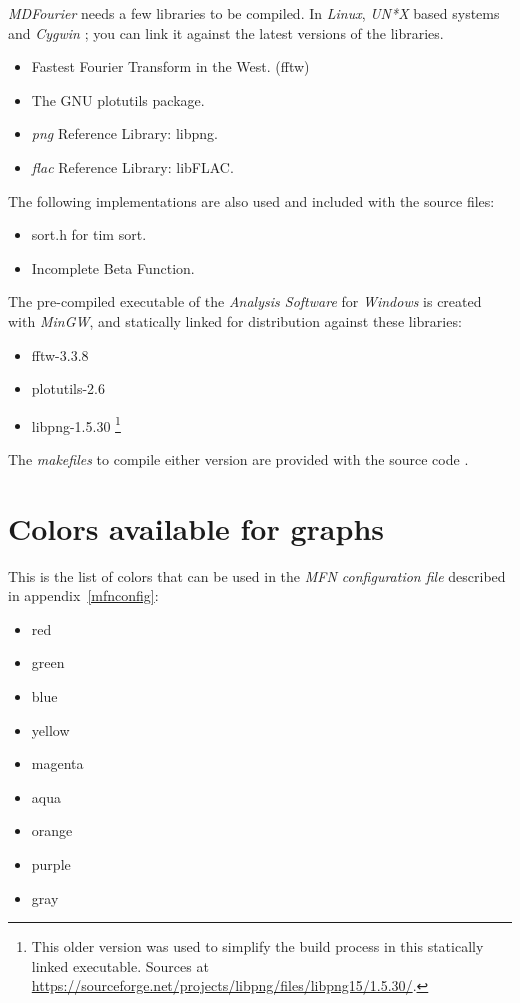\documentclass[10pt,a4paper]{report}
\newcommand{\ac}[1]{\textit{\mbox{\acrshort{#1}}}}
\begin{document}
\begin{appendices}
\textit{MDFourier} needs a few libraries to be compiled. In \textit{Linux}, \textit{UN*X} based systems and \textit{Cygwin} \cite{cygwin}; you can link it against the latest versions of the libraries. 

\begin{itemize}
	\item Fastest Fourier Transform in the West. (fftw) \cite{fftw}
	\item The GNU plotutils package. \cite{libplot}
	\item \ac{png} Reference Library: libpng. \cite{libpng}
	\item \ac{flac} Reference Library: libFLAC. \cite{libflac}
\end{itemize}

The following implementations are also used and included with the source files:

\begin{itemize}
	\item sort.h for tim sort. \cite{sort}
	\item Incomplete Beta Function. \cite{betafunction}
\end{itemize}

The pre-compiled executable of the \textit{Analysis Software} for \textit{Windows} is created with \textit{MinGW}\cite{mingw}, and statically linked for distribution against these libraries:

\begin{itemize}
	\item fftw-3.3.8 \cite{fftw}
	\item plotutils-2.6 \cite{libplot}
	\item libpng-1.5.30 \footnote{This older version was used to simplify the build process in this statically linked executable. Sources at \url{https://sourceforge.net/projects/libpng/files/libpng15/1.5.30/}.}
\end{itemize}

The \textit{makefiles} to compile either version are provided with the source code \cite{sourcecode}.

\chapter{Colors available for graphs}
\label{availablecolors}

This is the list of colors that can be used in the \textit{MFN configuration file} described in appendix~\ref{mfnconfig}: 

\begin{itemize}
	\item red
	\item green
	\item blue
	\item yellow
	\item magenta
	\item aqua
	\item orange
	\item purple
	\item gray
\end{itemize}


\end{appendices}
\end{document}
